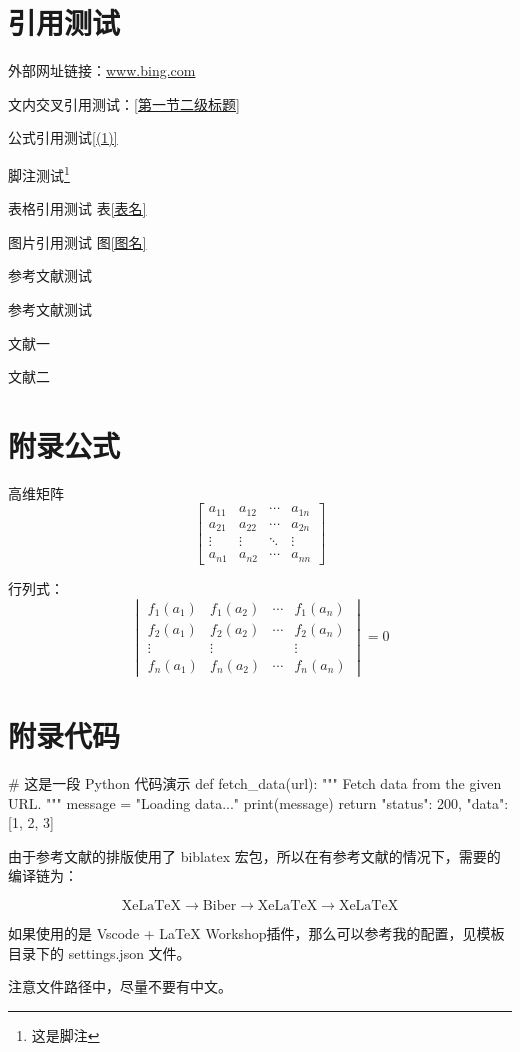 \documentclass[a4paper,AutoFakeBold={2.7},UTF8,zihao=5,twoside]{ctexart} %
\numberwithin{equation}{section}%
\begin{document}
\section{引用测试}

外部网址链接：\url{www.bing.com}

文内交叉引用测试：\ref{第一节二级标题}

公式引用测试\eqref{(1)}

脚注测试\footnote{这是脚注}

表格引用测试 表\ref{表名}

图片引用测试 图\ref{图名}

参考文献测试

参考文献测试

文献一\parencite{ref1}

文献二\parencite{ref2}

\clearpage

\section{附录公式}

高维矩阵
\begin{equation}
	\begin{bmatrix}
		a_{11} & a_{12} & \cdots & a_{1n} \\
		a_{21} & a_{22} & \cdots & a_{2n} \\
		\vdots & \vdots & \ddots & \vdots \\
		a_{n1} & a_{n2} & \cdots & a_{nn}
	\end{bmatrix}
\end{equation}

行列式：
\begin{equation}
  \begin{vmatrix}
    f_1(a_1) & f_1(a_2) & \cdots & f_1(a_n) \\
    f_2(a_1) & f_2(a_2) & \cdots & f_2(a_n) \\
    \vdots   & \vdots   &        & \vdots   \\
    f_n(a_1) & f_n(a_2) & \cdots & f_n(a_n)
  \end{vmatrix}
  = 0
\end{equation}

\clearpage

\section{附录代码}

\begin{code}[Python]
# 这是一段 Python 代码演示
def fetch_data(url):
    """
    Fetch data from the given URL.
    """
    message = "Loading data..."
    print(message)
    return {"status": 200, "data": [1, 2, 3]}
\end{code}

由于参考文献的排版使用了 biblatex 宏包，所以在有参考文献的情况下，需要的编译链为：

\begin{equation*}
	\text{XeLaTeX} \to \text{Biber} \to \text{XeLaTeX} \to \text{XeLaTeX}
\end{equation*}

如果使用的是 Vscode + LaTeX Workshop插件，那么可以参考我的配置，见模板目录下的 settings.json 文件。

注意文件路径中，尽量不要有中文。
\end{document}
